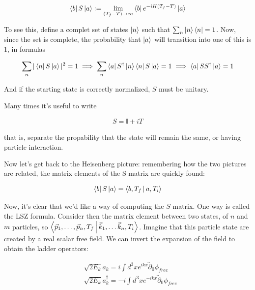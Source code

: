 \documentclass{report}
\begin{document}
\begin{align}
    \bra{b}S\ket{a} := \lim_{(T_f-T) \rightarrow \infty} \bra{b}e^{-iH(T_f-T)}\ket{a}
\end{align}


To see this, define a complet set of states \(\ket{n}\) such that \(\sum_n \ket{n}\bra{n} = 1\). Now, since the set is complete, the probability that \(\ket{a}\) will transition into one of this is 1, in formulas 

\begin{align}
    \sum_n |\bra{n}S\ket{a}|^2 = 1 \implies \sum_n \bra{a}S^\dagger \ket{n} \bra{n}S\ket{a} = 1 \implies \bra{a}SS^\dagger\ket{a} = 1
\end{align}

And if the starting state is correctly normalized, \(S\) must be unitary. 

Many times it's useful to write

\begin{align}
    S = \mathbb{I} + i T
\end{align}

that is, separate the propability that the state will remain the same, or having particle interaction. 

Now let's get back to the Heisenberg picture: remembering how the two pictures are related, the matrix elements of the S matrix are quickly found: 

\begin{align}
    \bra{b}S\ket{a} = \Braket{b, T_f | a, T_i}
\end{align}

Now, it's clear that we'd like a way of computing the \(S\) matrix. One way is called the LSZ formula. Consider then the matrix element between two states, of \(n\) and \(m\) particles, so \(\Braket{\vec{p}_1, \ldots, \vec{p}_n, T_f | \vec{k}_1, \ldots \vec{k}_n, T_i}\). Imagine that this particle state are created by a real scalar free field. We can invert the expansion of the field to obtain the ladder operators: 

\begin{align}
    &\sqrt{2E_k}a_k = i \int d^3x e^{ikx} \overleftrightarrow{\partial}_0 \phi_{free} \\
    &\sqrt{2E_k}a^\dagger_k = -i\int d^3x e^{-ikx}\overleftrightarrow{\partial}_0 \phi_{free}
\end{align}
\end{document}
